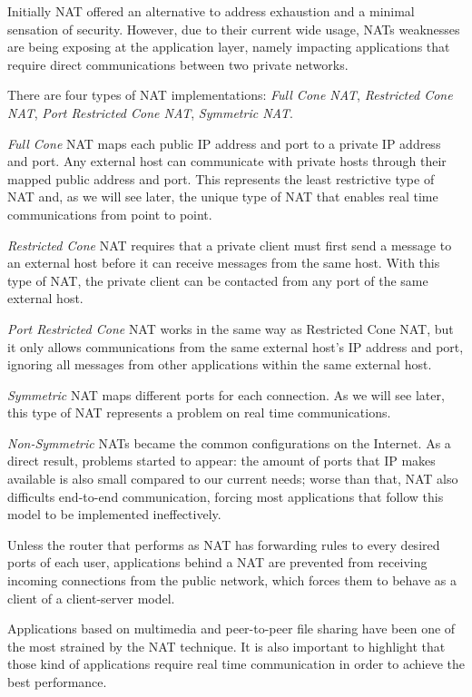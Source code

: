 Initially \ac{NAT} offered an alternative to address exhaustion and a minimal sensation of security.
However, due to their current wide usage, \ac{NAT}s weaknesses are being exposing at the application layer, namely impacting applications that require direct communications between two private networks.

There are four types of \ac{NAT} implementations\cite{rfc3489}: \emph{Full Cone NAT}, \emph{Restricted Cone NAT}, \emph{Port Restricted Cone NAT}, \emph{Symmetric NAT}.

\emph{Full Cone} \ac{NAT} maps each public \ac{IP} address and port to a private \ac{IP} address and port.
Any external host can communicate with private hosts through their mapped public address and port. This represents the least restrictive type of \ac{NAT} and, as we will see later, the unique type of \ac{NAT} that enables real time communications from point to point.

\emph{Restricted Cone} \ac{NAT} requires that a private client must first send a message to an external host before it can receive messages from the same host. With this type of \ac{NAT}, the private client can be contacted from any port of the same external host.

\emph{Port Restricted Cone} \ac{NAT} works in the same way as Restricted Cone \ac{NAT}, but it only allows communications from the same external host's IP address and port, ignoring all messages from other applications within the same external host.

\emph{Symmetric} NAT maps different ports for each connection. As we will see later, this type of \ac{NAT} represents a problem on real time communications.

\emph{Non-Symmetric} \ac{NAT}s became the common configurations on the Internet. As a direct result, problems started to appear: the amount of ports that \ac{IP} makes available is also small compared to our current needs; worse than that, \ac{NAT} also difficults end-to-end communication, forcing most applications that follow this model to be implemented ineffectively.

Unless the router that performs as \ac{NAT} has forwarding rules to every desired ports of each user, applications behind a \ac{NAT} are prevented from receiving incoming connections from the public network, which forces them to behave as a client of a client-server model. 

Applications based on multimedia and peer-to-peer file sharing have been one of the most strained by the \ac{NAT} technique. It is also important to highlight that those kind of applications require real time communication in order to achieve the best performance.


